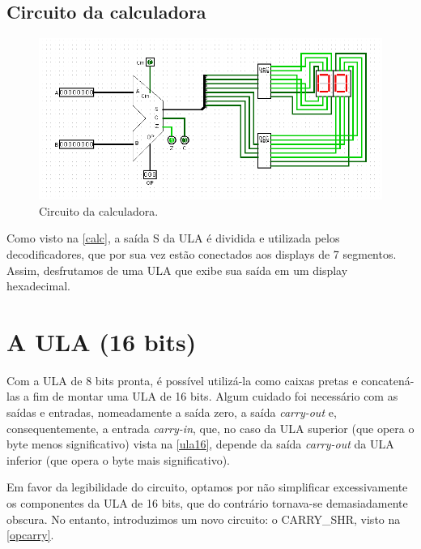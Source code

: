 \documentclass[
	12pt,				%
	openright,			%
	twoside,			%
	a4paper,			%
	english,			%
	french,				%
	spanish,			%
	brazil,				%
	]{abntex2}
\begin{document}
\section{Circuito da calculadora}
\begin{figure}[H]
	\begin{center}
	    \includegraphics[scale=0.57]{imagens/calc.png}
	\end{center}
\caption{\label{calc}Circuito da calculadora.}
\end{figure}

Como visto na \autoref{calc}, a saída S da ULA é dividida e utilizada pelos decodificadores, que por sua vez estão conectados aos displays de 7 segmentos. Assim, desfrutamos de uma ULA que exibe sua saída em um display hexadecimal.


\chapter{A ULA (16 bits)}

Com a ULA de 8 bits pronta, é possível utilizá-la como caixas pretas e concatená-las a fim de montar uma ULA de 16 bits. Algum cuidado foi necessário com as saídas e entradas, nomeadamente a saída zero, a saída \textit{carry-out} e, consequentemente, a entrada \textit{carry-in}, que, no caso da ULA superior (que opera o byte menos significativo) vista na \autoref{ula16}, depende da saída \textit{carry-out} da ULA inferior (que opera o byte mais significativo).

Em favor da legibilidade do circuito, optamos por não simplificar excessivamente os componentes da ULA de 16 bits, que do contrário tornava-se demasiadamente obscura. No entanto, introduzimos um novo circuito: o CARRY\_SHR, visto na \autoref{opcarry}.
\end{document}

